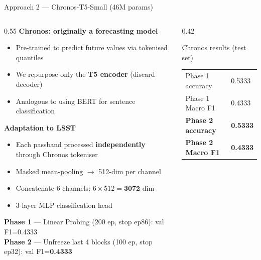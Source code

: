 \documentclass[aspectratio=169, 10pt]{beamer}
\begin{document}
\begin{frame}{Approach 2 — Chronos-T5-Small (46M params)}
  \begin{columns}
    \begin{column}{0.55\textwidth}
      \small\textbf{Chronos: originally a forecasting model}
      \begin{itemize}\setlength\itemsep{1pt}
        \item Pre-trained to predict future values via tokenised quantiles
        \item We repurpose only the \textbf{T5 encoder} (discard decoder)
        \item Analogous to using BERT for sentence classification
      \end{itemize}
      \vspace{0.2em}
      \small\textbf{Adaptation to LSST}
      \begin{itemize}\setlength\itemsep{1pt}
        \item Each passband processed \textbf{independently} through Chronos tokeniser
        \item Masked mean-pooling $\to$ 512-dim per channel
        \item Concatenate 6 channels: $6 \times 512 = \mathbf{3072}$-dim
        \item 3-layer MLP classification head
      \end{itemize}
      \vspace{0.2em}
      \small\textbf{Phase 1} — Linear Probing (200 ep, stop ep86): val F1=0.4333\\
      \small\textbf{Phase 2} — Unfreeze last 4 blocks (100 ep, stop ep32): val F1=\textbf{0.4333}
    \end{column}
    \begin{column}{0.42\textwidth}
      \begin{block}{Chronos results (test set)}
        \begin{center}
        \small
        \begin{tabular}{ll}
          \toprule
          Phase 1 accuracy & 0.5333 \\
          Phase 1 Macro F1 & 0.4333 \\
          \midrule
          \textbf{Phase 2 accuracy} & \textbf{0.5333} \\
          \textbf{Phase 2 Macro F1} & \textbf{0.4333} \\
          \bottomrule
        \end{tabular}

\end{center}
\end{block}
\end{column}
\end{columns}
\end{frame}
\end{document}
